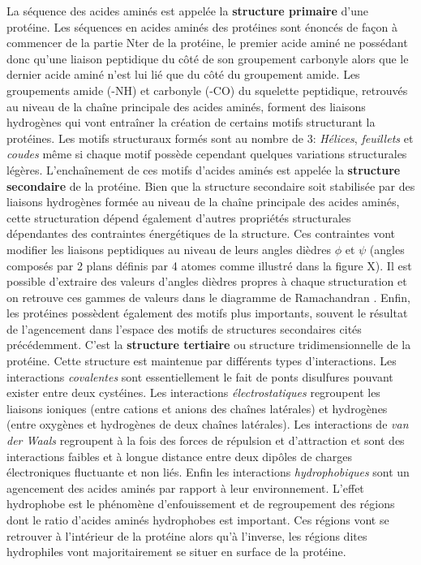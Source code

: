 La séquence des acides aminés est appelée la \textbf{structure primaire} d'une protéine. Les séquences en acides aminés des protéines sont énoncés de façon à commencer de la partie Nter de la protéine, le premier acide aminé ne possédant donc qu'une liaison peptidique du côté de son groupement carbonyle alors que le dernier acide aminé n'est lui lié que du côté du groupement amide.
Les groupements amide (-NH) et carbonyle (-CO) du squelette peptidique, retrouvés au niveau de la chaîne principale des acides aminés, forment des liaisons hydrogènes qui vont entraîner la création de certains motifs structurant la protéines. Les motifs structuraux formés sont au nombre de 3: \textit{Hélices}, \textit{feuillets} et \textit{coudes} même si chaque motif possède cependant quelques variations structurales légères. L’enchaînement de ces motifs d'acides aminés est appelée la \textbf{structure secondaire} de la protéine. Bien que la structure secondaire soit stabilisée par des liaisons hydrogènes formée au niveau de la chaîne principale des acides aminés, cette structuration dépend également d'autres propriétés structurales dépendantes des contraintes énergétiques de la structure. Ces contraintes vont modifier les liaisons peptidiques au niveau de leurs angles dièdres $\phi$ et $\psi$ (angles composés par 2 plans définis par 4 atomes comme illustré dans la figure X). Il est possible d'extraire des valeurs d'angles dièdres propres à chaque structuration et on retrouve ces gammes de valeurs dans le diagramme de Ramachandran \cite{ramachandran1968conformation}.
Enfin, les protéines possèdent également des motifs plus importants, souvent le résultat de l'agencement dans l'espace des motifs de structures secondaires cités précédemment. C'est la \textbf{structure tertiaire} ou structure tridimensionnelle de la protéine. Cette structure est maintenue par différents types d'interactions. Les interactions \textit{covalentes} sont essentiellement le fait de ponts disulfures pouvant exister entre deux cystéines. Les interactions \textit{électrostatiques} regroupent les liaisons ioniques (entre cations et anions des chaînes latérales) et hydrogènes (entre oxygènes et hydrogènes de deux chaînes latérales). Les interactions de \textit{van der Waals} regroupent à la fois des forces de répulsion et d'attraction et sont des interactions faibles et à longue distance entre deux dipôles de charges électroniques fluctuante et non liés. Enfin les interactions \textit{hydrophobiques} sont un agencement des acides aminés par rapport à leur environnement. L'effet hydrophobe est le phénomène d'enfouissement et de regroupement des régions dont le ratio d'acides aminés hydrophobes est important. Ces régions vont se retrouver à l'intérieur de la protéine alors qu'à l'inverse, les régions dites hydrophiles vont majoritairement se situer en surface de la protéine.
